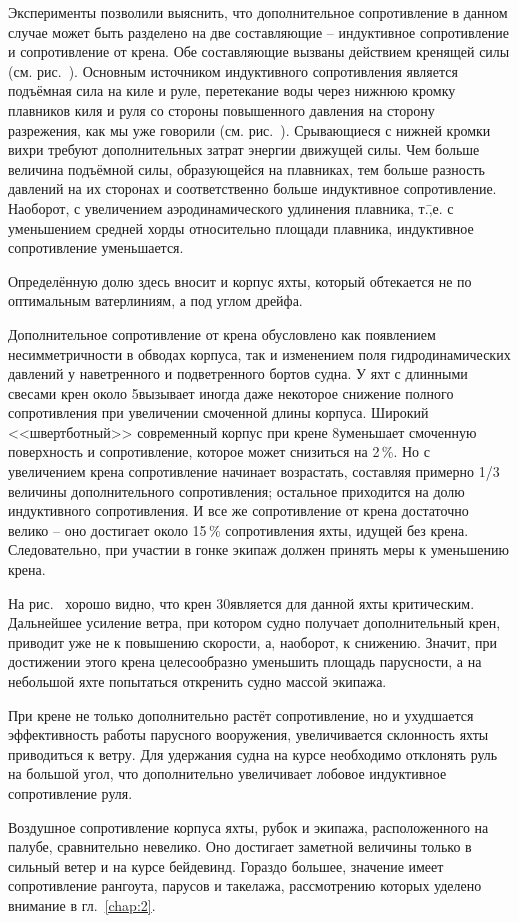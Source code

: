 Эксперименты позволили выяснить, что дополнительное сопротивление в
данном случае может быть разделено на две составляющие \---
индуктивное сопротивление и сопротивление от крена. Обе составляющие
вызваны действием кренящей силы 
(см. рис.~). Основным источником индуктивного сопротивления
является подъёмная сила на киле и руле, перетекание воды через нижнюю
кромку плавников киля и руля со стороны повышенного давления на
сторону разрежения, как мы уже говорили
(см. рис.~). Срывающиеся с нижней кромки вихри требуют
дополнительных затрат энергии движущей силы. Чем больше величина
подъёмной силы, образующейся на плавниках, тем больше разность
давлений на их сторонах и соответственно больше индуктивное
сопротивление. Наоборот, с увеличением аэродинамического удлинения
плавника, т.\=,е. с уменьшением средней хорды относительно площади
плавника, индуктивное сопротивление уменьшается.

Определённую долю здесь вносит и корпус яхты, который обтекается не по
оптимальным ватерлиниям, а под углом дрейфа.

Дополнительное сопротивление от крена обусловлено как появлением
несимметричности в обводах корпуса, так и изменением поля
гидродинамических давлений у наветренного и подветренного бортов
судна. У яхт с длинными свесами крен около 5\gr вызывает иногда даже
некоторое снижение полного сопротивления при увеличении смоченной
длины корпуса. Широкий <<швертботный>> современный корпус при крене
8\gr уменьшает смоченную поверхность и сопротивление, которое
может снизиться на 2\,\%. Но с увеличением крена сопротивление
начинает возрастать, составляя примерно 1/3 величины дополнительного
сопротивления; остальное приходится на долю индуктивного
сопротивления. И все же сопротивление от крена достаточно велико \---
оно достигает около 15\,\% сопротивления яхты, идущей без
крена. Следовательно, при участии в гонке экипаж должен принять меры к
уменьшению крена.

На рис.~ хорошо видно, что крен 30\gr является для данной яхты
критическим. Дальнейшее усиление ветра, при котором судно получает
дополнительный крен, приводит уже не к повышению скорости, а,
наоборот, к снижению. Значит, при достижении этого крена целесообразно
уменьшить площадь парусности, а на небольшой яхте попытаться откренить
судно массой экипажа.

При крене не только дополнительно растёт сопротивление, но и
ухудшается эффективность работы парусного вооружения, увеличивается
склонность яхты приводиться к ветру. Для удержания судна на курсе
необходимо отклонять руль на большой угол, что дополнительно
увеличивает лобовое индуктивное сопротивление руля.

Воздушное сопротивление корпуса яхты, рубок и экипажа, расположенного
на палубе, сравнительно невелико. Оно достигает заметной величины
только в сильный ветер и на курсе бейдевинд. Гораздо большее, значение
имеет сопротивление рангоута, парусов и такелажа, рассмотрению которых
уделено внимание в гл.~\ref{chap:2}.

\onecolumn

